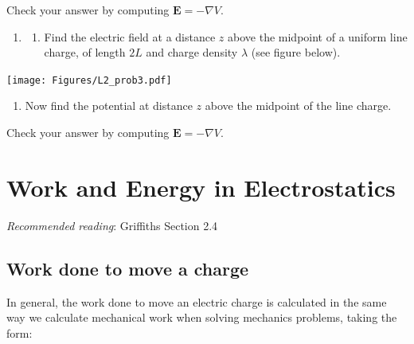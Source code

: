 \documentclass[
  letterpaper,
  DIV=11,
  numbers=noendperiod]{scrreprt}
\providecommand{\tightlist}{%
  \setlength{\itemsep}{0pt}\setlength{\parskip}{0pt}}\usepackage{longtable,booktabs,array}
\begin{document}
Check your answer by computing \(\mathrm{\mathbf{E}}= -\nabla V\).

\begin{enumerate}
\def\labelenumi{\arabic{enumi})}
\setcounter{enumi}{2}
\tightlist
\item
  \begin{enumerate}
  \def\labelenumii{(\alph{enumii})}
  \tightlist
  \item
    Find the electric field at a distance \(z\) above the midpoint of a
    uniform line charge, of length \(2L\) and charge density \(\lambda\)
    (see figure below).
  \end{enumerate}
\end{enumerate}

\texttt{[image: Figures/L2\_prob3.pdf]}

\begin{enumerate}
\def\labelenumi{(\alph{enumi})}
\setcounter{enumi}{1}
\tightlist
\item
  Now find the potential at distance \(z\) above the midpoint of the
  line charge.
\end{enumerate}

Check your answer by computing \(\mathrm{\mathbf{E}}= -\nabla V\).


\chapter{Work and Energy in
Electrostatics}\label{work-and-energy-in-electrostatics}

\newcommand{\l}{\mathrm{\mathbf{l}}}
\newcommand{\E}{\mathrm{\mathbf{E}}}
\newcommand{\F}{\mathrm{\mathbf{F}}}
\newcommand{\r}{\mathrm{\mathbf{r}}}

\newcommand{\x}{\mathrm{\mathbf{x}}}
\newcommand{\y}{\mathrm{\mathbf{y}}}
\newcommand{\z}{\mathrm{\mathbf{z}}}
\newcommand{\p}{\mathrm{\mathbf{p}}}
\newcommand{\d}{\mathrm{\mathbf{d}}}

\newcommand{\a}{\mathrm{\mathbf{a}}}
\newcommand{\b}{\mathrm{\mathbf{b}}}

\emph{Recommended reading}: Griffiths Section 2.4

\section{Work done to move a charge}\label{work-done-to-move-a-charge}

In general, the work done to move an electric charge is calculated in
the same way we calculate mechanical work when solving mechanics
problems, taking the form:
\end{document}
